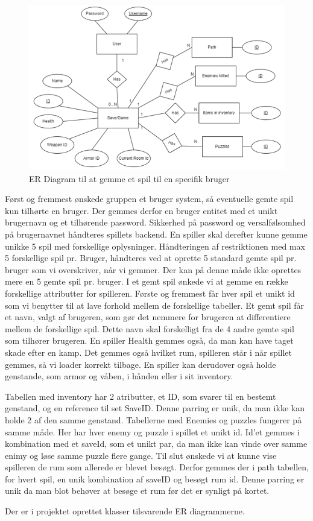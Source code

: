 \begin{figure}[H]
\centering
\includegraphics[width = \textwidth]{02-Body/Images/ER-GameSave.PNG}
\caption{ER Diagram til at gemme et spil til en specifik bruger}
\label{fig:ER-GameSave}
\end{figure}

Først og fremmest ønskede gruppen et bruger system, så eventuelle gemte spil kun tilhørte en bruger.
Der gemmes derfor en bruger entitet med et unikt brugernavn og et tilhørende password.
Sikkerhed på password og versalfølsomhed på brugernavnet håndteres spillets backend.
En spiller skal derefter kunne gemme unikke 5 spil med forskellige oplysninger.
Håndteringen af restriktionen med max 5 forskellige spil pr. Bruger, håndteres ved at oprette 5 standard gemte spil pr. bruger som vi overskriver, når vi gemmer. Der kan på denne måde ikke oprettes mere en 5 gemte spil pr. bruger.
I et gemt spil ønkede vi at gemme en række forskellige attributter for spilleren.
Første og fremmest får hver spil et unikt id som vi benytter til at lave forhold mellem de forskellige tabeller.
Et gemt spil får et navn, valgt af brugeren, som gør det nemmere for brugeren at differentiere mellem de forskellige spil. Dette navn skal forskelligt fra de 4 andre gemte spil som tilhører brugeren.
En spiller Health gemmes også, da man kan have taget skade efter en kamp. Det gemmes også hvilket rum, spilleren står i når spillet gemmes, så vi loader korrekt tilbage. 
En spiller kan derudover også holde genstande, som armor og våben, i hånden eller i sit inventory.

Tabellen med inventory har 2 atributter, et ID, som svarer til en bestemt genstand, og en reference til set SaveID. Denne parring er unik, da man ikke kan holde 2 af den samme genstand.
Tabellerne med Enemies og puzzles fungerer på samme måde. Her har hver enemy og puzzle i spillet et unikt id. Id’et gemmes i kombination med et saveId, som et unikt par, da man ikke kan vinde over samme enimy og løse samme puzzle flere gange.
Til slut ønskede vi at kunne vise spilleren de rum som allerede er blevet besøgt.
Derfor gemmes der i path tabellen, for hvert spil, en unik kombination af saveID og besøgt rum id. Denne parring er unik da man blot behøver at besøge et rum før det er synligt på kortet. 

Der er i projektet oprettet klasser tilsvarende ER diagrammerne.
